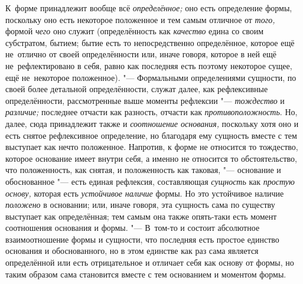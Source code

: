 К~форме принадлежит вообще всё {\em определённое;} оно есть определение формы,
поскольку оно есть некоторое положенное и тем самым отличное от {\em того,}
формой {\em чего} оно служит (определённость как {\em качество} едина со своим
субстратом, бытием; бытие есть то непосредственно определённое, которое ещё
не~отлично от своей определённости или, иначе говоря, которое в ней ещё
не~рефлектировано в себя, равно как последняя есть поэтому некоторое сущее, ещё
не~некоторое положенное). "--- Формальными определениями сущности, по своей
более детальной определённости, служат далее, как рефлексивные определённости,
рассмотренные выше моменты рефлексии "--- {\em тождество} и {\em различие;}
последнее отчасти как разность, отчасти как {\em противоположность}. Но, далее,
сюда принадлежит также и {\em соотношение основания,} поскольку хотя оно и есть
снятое рефлексивное определение, но благодаря ему сущность вместе с тем
выступает как нечто положенное. Напротив, к форме не относится то тождество,
которое основание имеет внутри себя, а именно не относится то обстоятельство,
что положенность, как снятая, и положенность как таковая, "--- основание и
обоснованное "--- есть единая рефлексия, составляющая {\em сущность} как
{\em простую основу,} которая есть {\em устойчивое наличие} формы. Но это
устойчивое наличие {\em положено} в основании; или, иначе говоря, эта сущность
сама по существу выступает как определённая; тем самым она также опять-таки
есть момент соотношения основания и формы. "--- В~том-то и состоит абсолютное
взаимоотношение формы и сущности, что последняя есть простое единство основания
и обоснованного, но в этом единстве как раз сама является определённой или есть
отрицательное и отличает себя как основу от формы, но таким образом сама
становится вместе с тем основанием и моментом формы.

